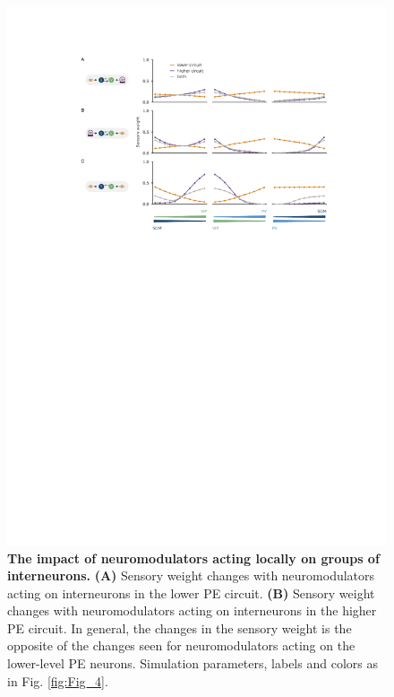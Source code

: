 \documentclass[10pt,a4paper,draft]{article}
\begin{document}
\begin{figure}[!h]
	\centering
    \includegraphics{../results/figures/final/Fig_4_S2}%
\caption{\footnotesize{\bf The impact of neuromodulators acting locally on groups of interneurons. \newline}  
{\bf (A)} Sensory weight changes with neuromodulators acting on interneurons in the lower PE circuit.
{\bf (B)} Sensory weight changes with neuromodulators acting on interneurons in the higher PE circuit. In general, the changes in the sensory weight is the opposite of the changes seen for neuromodulators acting on the lower-level PE neurons. Simulation parameters, labels and colors as in Fig. \ref{fig:Fig_4}. 
}
\label{fig:Fig_4_S2}
\end{figure}
\end{document}
